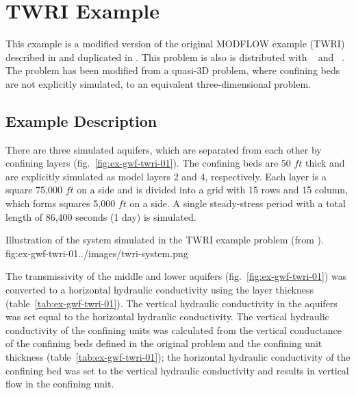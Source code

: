 \section{TWRI Example}

This example is a modified version of the original MODFLOW example (TWRI) described in \cite{modflow88} and duplicated in \cite{harbaugh1996user}. This problem is also is distributed with \mff~\citep{modflow2005} and \mf~\citep{modflow6software}. The problem has been modified from a quasi-3D problem, where confining beds are not explicitly simulated, to an equivalent three-dimensional problem.

\subsection{Example Description}
There are three simulated aquifers, which are separated from each other by confining layers (fig.~\ref{fig:ex-gwf-twri-01}). The confining beds are 50 $ft$ thick and are explicitly simulated as model layers 2 and 4, respectively. Each layer is a square 75,000 $ft$ on a side and is divided into a grid with 15 rows and 15 column, which forms squares 5,000 $ft$ on a side. A single steady-stress period with a total length of 86,400 seconds (1 day) is simulated.

\begin{StandardFigure}{
                                     Illustration of the system simulated in the TWRI example problem (from \cite{modflow88}).
                                     }{fig:ex-gwf-twri-01}{../images/twri-system.png}
\end{StandardFigure}                                 

The transmissivity of the middle and lower aquifers (fig.~\ref{fig:ex-gwf-twri-01}) was converted to a horizontal hydraulic conductivity using the layer thickness (table~\ref{tab:ex-gwf-twri-01}). The vertical hydraulic conductivity in the aquifers was set equal to the horizontal hydraulic conductivity. The vertical hydraulic conductivity of the confining units was calculated from the vertical conductance of the confining beds defined in the original problem and the confining unit thickness (table~\ref{tab:ex-gwf-twri-01}); the horizontal hydraulic conductivity of the confining bed was set to the vertical hydraulic conductivity and results in vertical flow in the confining unit.

